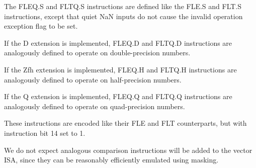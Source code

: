 The FLEQ.S and FLTQ.S instructions are defined like the FLE.S and FLT.S
instructions, except that quiet NaN inputs do not cause the invalid
operation exception flag to be set.

If the D extension is implemented, FLEQ.D and FLTQ.D instructions are
analogously defined to operate on double-precision numbers.

If the Zfh extension is implemented, FLEQ.H and FLTQ.H instructions are
analogously defined to operate on half-precision numbers.

If the Q extension is implemented, FLEQ.Q and FLTQ.Q instructions are
analogously defined to operate on quad-precision numbers.

These instructions are encoded like their FLE and FLT counterparts, but
with instruction bit 14 set to 1.

\begin{commentary}
We do not expect analogous comparison instructions will be added to the vector
ISA, since they can be reasonably efficiently emulated using masking.
\end{commentary}
